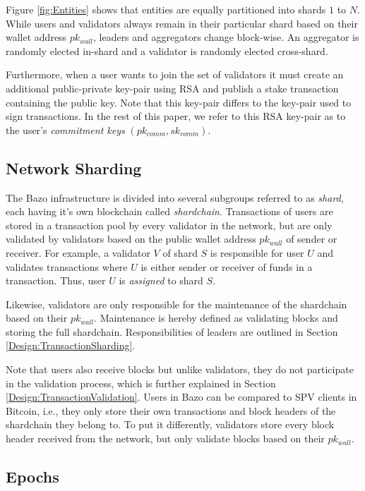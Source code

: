 Figure \ref{fig:Entities} shows that entities are equally partitioned into shards $1$ to $N$. While users and validators always remain in their particular shard based on their wallet address $pk_{wall}$, leaders and aggregators change block-wise. An aggregator is randomly elected in-shard and a validator is randomly elected cross-shard.

Furthermore, when a user wants to join the set of validators it must create an additional public-private key-pair using RSA and publish a stake transaction containing the public key. Note that this key-pair differs to the key-pair used to sign transactions. In the rest of this paper, we refer to this RSA key-pair as to the user's \textit{commitment keys} $(pk_{comm}, sk_{comm})$.

\subsection{Network Sharding}
\label{Design:NetworkSharding}

The Bazo infrastructure is divided into several subgroups referred to as \textit{shard}, each having it's own blockchain called \textit{shardchain}. Transactions of users are stored in a transaction pool by every validator in the network, but are only validated by validators based on the public wallet address $pk_{wall}$ of sender or receiver. For example, a validator $V$ of shard $S$ is responsible for user $U$ and validates transactions where $U$ is either sender or receiver of funds in a transaction. Thus, user $U$ is \textit{assigned} to shard $S$.

Likewise, validators are only responsible for the maintenance of the shardchain based on their $pk_{wall}$. Maintenance is hereby defined as validating blocks and storing the full shardchain. Responsibilities of leaders are outlined in Section \ref{Design:TransactionSharding}. 

Note that users also receive blocks but unlike validators, they do not participate in the validation process, which is further explained in Section \ref{Design:TransactionValidation}. Users in Bazo can be compared to SPV clients in Bitcoin, i.e., they only store their own transactions and block headers of the shardchain they belong to. To put it differently, validators store every block header received from the network, but only validate blocks based on their $pk_{wall}$.

\subsection{Epochs} 

